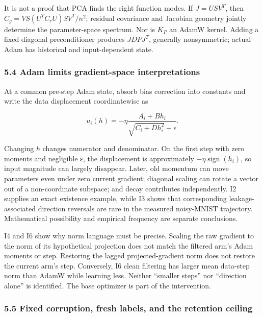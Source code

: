 \documentclass[
  british,
  10pt,
  a4paper,
]{article}
\begin{document}
It is not a proof that PCA finds the right function modes. If
\(J=USV^T\), then \(C_g=VS(U^TC_rU)SV^T/n^2\); residual covariance and
Jacobian geometry jointly determine the parameter-\allowbreak{}space
spectrum. Nor is \(K_P\) an AdamW kernel. Adding a fixed diagonal
preconditioner produces \(JDPJ^T\), generally nonsymmetric; actual Adam
has historical and input-\allowbreak{}dependent state.

\subsubsection{\texorpdfstring{5.4 Adam limits
gradient-\allowbreak{}space
interpretations}{5.4 Adam limits  interpretations}}\label{synthesis--adam-limits-gradient-space-interpretations}

At a common pre-step Adam state, absorb bias correction into constants
and write the data displacement coordinatewise as

\[
u_i(h)=-\eta\frac{A_i+B h_i}{\sqrt{C_i+D h_i^2}+\epsilon}.
\]

Changing \(h\) changes numerator and denominator.\allowbreak{} On the
first step with zero moments and negligible ε, the displacement is
approximately \(-\eta\operatorname{sign}(h_i)\), so input magnitude can
largely disappear. Later, old momentum can move parameters even under
zero current gradient; diagonal scaling can rotate a vector out of a
non-\allowbreak{}coordinate subspace; and decay contributes
independentl\allowbreak{}y.\allowbreak{} I2 supplies an exact existence
example, while I3 shows that corresponding
leakage-\allowbreak{}associated direction reversals are rare in the
measured noisy-\allowbreak{}MNIST trajectory.\allowbreak{} Mathematical
possibility and empirical frequency are separate
conclusions.\allowbreak{}

I4 and I6 show why norm language must be precise. Scaling the raw
gradient to the norm of its hypothetical projection does not match the
filtered arm's Adam moments or step. Restoring the lagged
projected-\allowbreak{}gradient norm does not restore the current arm's
step. Conversely,\allowbreak{} I6 clean filtering has larger mean
data-step norm than AdamW while learning less. Neither ``smaller steps''
nor ``direction alone'' is identified.\allowbreak{} The base optimizer
is part of the intervention\allowbreak{}.\allowbreak{}

\subsubsection{\texorpdfstring{5.5 Fixed corruption,\allowbreak{} fresh
labels, and the retention
ceiling}{5.5 Fixed  fresh labels, and the retention ceiling}}\label{synthesis--fixed-corruption-fresh-labels-and-the-retention-ceiling}
\end{document}
